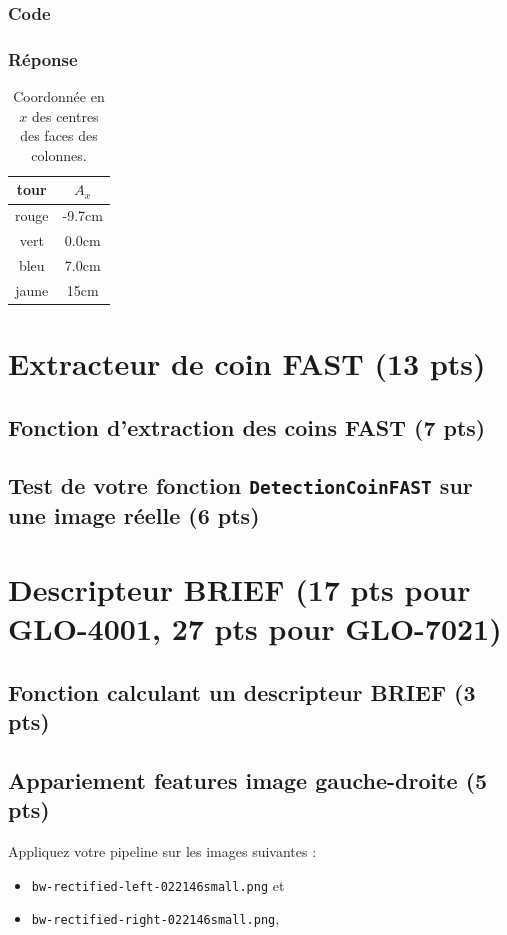 \documentclass[12pt]{article}
\begin{document}
\subsubsection{Code}
\subsubsection{Réponse}

\begin{table}[h]
\caption{Coordonnée en $x$ des centres des faces des colonnes.}
\label{TableX}
\begin{center}
\begin{tabular}{|c|c|}
\hline
 tour   &  $A_x$ \\
\hline
 rouge  &  -9.7cm     \\
 vert   &  0.0cm  \\
 bleu   &  7.0cm    \\
 jaune  &  15cm     \\
\hline
\end{tabular}
\end{center}
\end{table}


\newpage
\section{Extracteur de coin FAST (13 pts)}
 \label{SectionFAST}

\subsection{Fonction d'extraction des coins FAST (7 pts)}
\subsection{Test de votre fonction \texttt{DetectionCoinFAST} sur une image réelle (6 pts)}

\newpage
\section{Descripteur BRIEF (17 pts pour GLO-4001, 27 pts pour GLO-7021)}

\subsection{Fonction calculant un descripteur BRIEF (3 pts)}

\subsection{Appariement features image gauche-droite (5 pts)}
 Appliquez votre pipeline sur les images suivantes :
 \begin{itemize}
 \item \texttt{bw-rectified-left-022146small.png} et
 \item \texttt{bw-rectified-right-022146small.png},
 \end{itemize}
\end{document}
